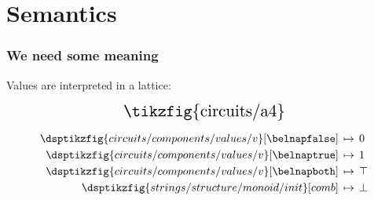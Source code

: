 \section{Semantics}

\begin{frame}
    \frametitle{We need some meaning}

    \wait
    Values are interpreted in a \alert{lattice}:
    \wait
    \begin{minipage}{0.49\textwidth}
        \[
            \scalebox{1.5}{\tikzfig{circuits/a4}}
        \]
    \end{minipage}
    \wait
    \begin{minipage}{0.49\textwidth}
        \begin{align*}
            \dsptikzfig{circuits/components/values/v}[\belnapfalse]
            \,&\mapsto\, 0 \\
            \dsptikzfig{circuits/components/values/v}[\belnaptrue]
            \,&\mapsto\, 1 \\
            \dsptikzfig{circuits/components/values/v}[\belnapboth]
            \,&\mapsto\, \top \\
            \dsptikzfig{strings/structure/monoid/init}[comb]
            \,&\mapsto\, \bot \\
        \end{align*}
    \end{minipage}
\end{frame}
